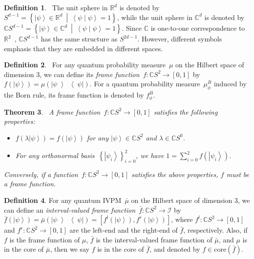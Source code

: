 \documentclass[12pt]{iopart}
\theoremstyle{plain}
\newtheorem{thm}{Theorem}
\theoremstyle{definition}
\newtheorem{definition}[thm]{Definition}
\newcommand{\ket}[1]{{\left\vert{#1}\right\rangle}}
\newcommand{\op}[2]{\ensuremath{\left\vert{#1}\middle\rangle\middle\langle{#2}\right\vert}}
\newcommand{\proj}[1]{\op{#1}{#1}}
\newcommand{\ip}[2]{\ensuremath{\left\langle{#1}\middle\vert{#2}\right\rangle}}
\newcommand{\set}[2]{\ensuremath{\left\{ {#1}~\middle|~{#2}\right\} }}
\begin{document}
\begin{definition}\cite{Hatcher2001,dryden2005}~The unit sphere
in $\mathbb{R}^{d}$ is denoted by $S^{d-1}=\set{\ket{\psi}\in\mathbb{R}^{d}}{\ip{\psi}{\psi}=1}$,
while the unit sphere in $\mathbb{C}^{d}$ is denoted by $\mathbb{C}S^{d-1}=\set{\ket{\psi}\in\mathbb{C}^{d}}{\ip{\psi}{\psi}=1}$.
Since $\mathbb{C}$ is one-to-one correspondence to $\mathbb{R}^{2}$~\cite{GAMELIN2003},
$\mathbb{C}S^{d-1}$ has the same structure as $S^{2d-1}$. However,
different symbols emphasis that they are embedded in different spaces.\end{definition}

\begin{definition}\cite{gleason1957,peres1995quantum,RichmanBridges1999}~For
any quantum probability measure~$\mu$ on the Hilbert space of dimension
3, we can define its \emph{frame function}~$f:\mathbb{C}S^{2}\rightarrow\left[0,1\right]$
by $f\left(\ket{\psi}\right)=\mu\left(\proj{\psi}\right)$. For a
quantum probability measure~$\mu_{\phi}^{B}$ induced by the Born
rule, its frame function is denoted by $f_{\phi}^{B}$.\end{definition}

\begin{thm}\label{thm:frame-function}\cite{gleason1957,peres1995quantum,RichmanBridges1999}~A
frame function~$f:\mathbb{C}S^{2}\rightarrow\left[0,1\right]$ satisfies
the following properties: 
\begin{itemize}
\item $f\left(\lambda\ket{\psi}\right)=f\left(\ket{\psi}\right)$ for any
$\ket{\psi}\in\mathbb{C}S^{2}$ and $\lambda\in\mathbb{C}S^{0}$. 
\item For any orthonormal basis~$\left\{ \ket{\psi_{i}}\right\} _{i=0}^{2}$,
we have $1=\sum_{i=0}^{2}f\left(\ket{\psi_{i}}\right)$. 
\end{itemize}
Conversely, if a function~$f:\mathbb{C}S^{2}\rightarrow\left[0,1\right]$
satisfies the above properties, $f$ must be a frame function.\end{thm}

\begin{definition}For any quantum IVPM~$\bar{\mu}$ on the Hilbert
space of dimension 3, we can define an \emph{interval-valued frame
function}~$\bar{f}:\mathbb{C}S^{2}\rightarrow\mathscr{I}$ by $\bar{f}\left(\ket{\psi}\right)=\bar{\mu}\left(\proj{\psi}\right)=\left[f^{l}\left(\ket{\psi}\right),f^{r}\left(\ket{\psi}\right)\right]$,
where $f^{l}:\mathbb{C}S^{2}\rightarrow\left[0,1\right]$ and $f^{r}:\mathbb{C}S^{2}\rightarrow\left[0,1\right]$
are the left-end and the right-end of $\bar{f}$, respectively. Also,
if $f$ is the frame function of $\mu$, $\bar{f}$ is the interval-valued
frame function of $\bar{\mu}$, and $\mu$ is in the core of $\bar{\mu}$,
then we say $f$ is in the core of $\bar{f}$, and denoted by $f\in\mathrm{core}\left(\bar{f}\right)$.\end{definition}
\end{document}
